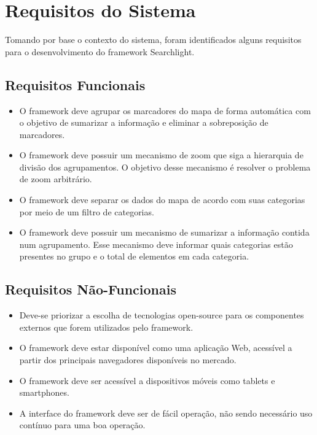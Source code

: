\section{Requisitos do Sistema}
Tomando por base o contexto do sistema, foram identificados alguns requisitos para o desenvolvimento do framework Searchlight.


\subsection{Requisitos Funcionais}

\begin{itemize}
\item O framework deve agrupar os marcadores do mapa de forma automática com o objetivo de sumarizar a informação e eliminar a sobreposição de marcadores.

\item O framework deve possuir um mecanismo de zoom que siga a hierarquia de divisão dos agrupamentos. O objetivo desse mecanismo é resolver o problema de zoom arbitrário.

\item O framework deve separar os dados do mapa de acordo com suas categorias por meio de um filtro de categorias. 

\item O framework deve possuir um mecanismo de sumarizar a informação contida num agrupamento. Esse mecanismo deve informar quais categorias estão presentes no grupo e o total de elementos em cada categoria.
\end{itemize}


\subsection{Requisitos Não-Funcionais}
\begin{itemize}
\item Deve-se priorizar a escolha de tecnologias open-source para os componentes externos que forem utilizados pelo framework.
\item O framework deve estar disponível como uma aplicação Web, acessível a partir dos principais navegadores disponíveis no mercado. 
\item O framework deve ser acessível a dispositivos móveis como tablets e smartphones.
\item A interface do framework deve ser de fácil operação, não sendo necessário uso contínuo para uma boa operação.
\end{itemize}

